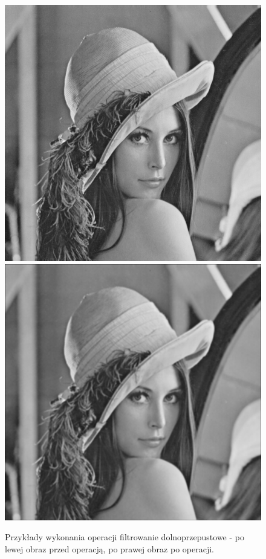 \documentclass{article}
\begin{document}
\begin{figure}[!htb]
\includegraphics[scale=0.2]{img/lena_8bit.png}  
\includegraphics[scale=0.2]{img/_Filtr_Dolnoprzepustowy_lena_8bit.png} 
\caption{Przykłady wykonania operacji filtrowanie dolnoprzepustowe - po lewej obraz przed operacją, po prawej obraz po operacji. }
\end{figure}
\end{document}

